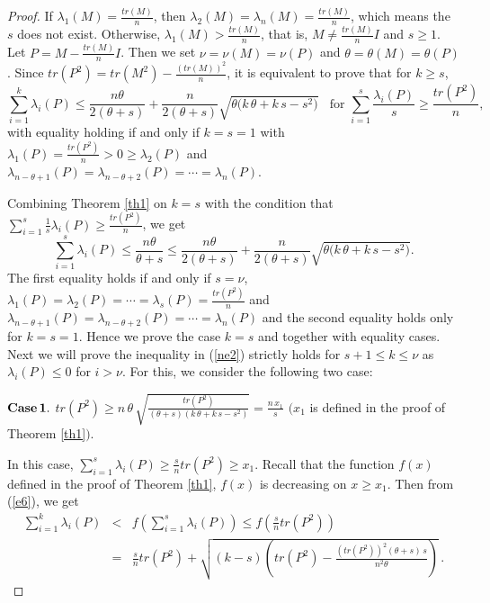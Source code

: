 \documentclass[10pt,a4paper]{amsart}
\begin{document}
\begin{proof}
If $\lambda_1(M)=\frac{tr(M)}{n}$, then $\lambda_2(M)=\lambda_n(M)=\frac{tr(M)}{n}$, which means the $s$ does not exist.
Otherwise, $\lambda_1(M)>\frac{tr(M)}{n}$, that is, $M\neq\frac{tr(M)}{n}I$ and $s\geq 1$. Let $P=M-\frac{tr(M)}{n}I$. Then we set $\nu=\nu(M)=\nu(P)$ and $\theta=\theta(M)=\theta(P)$.
 Since $tr(P^2)=tr(M^2)-\frac{(tr(M))^2}{n}$, it is equivalent to prove that for $k\geq s$,
 \begin{equation}
 \sum_{i=1}^{k}\lambda_i(P)\leq\frac{n\theta}{2(\theta+s)}+\frac{n}{2(\theta+s)}\sqrt{\theta\big(k\,\theta+k\,s-s^2\big)}~~~~\mbox{for  }\sum\limits_{i=1}^s\frac{\lambda_i(P)}{s}\geq \frac{tr(P^2)}{n},\label{ne2}
 \end{equation}
 with equality holding if and only if $k=s=1$ with $\lambda_1(P)=\frac{tr(P^2)}{n}>0\geq \lambda_2(P)$ and
 $\lambda_{n-\theta+1}(P)=\lambda_{n-\theta+2}(P)=\cdots=\lambda_n(P)$.

\vspace*{3mm}
 
 Combining Theorem \ref{th1} on $k=s$ with the condition that $\sum\limits_{i=1}^s\frac{1}{s}\lambda_i(P)\geq \frac{tr(P^2)}{n}$, we get
 $$\sum\limits_{i=1}^s\lambda_i(P)\leq\frac{n\theta}{\theta+s}\leq \frac{n\theta}{2(\theta+s)}+\frac{n}{2(\theta+s)}\sqrt{\theta\big(k\,\theta+k\,s-s^2\big)}.$$
 The first equality holds if and only if $s=\nu$, $\lambda_1(P)=\lambda_2(P)=\cdots=\lambda_s(P)=\frac{tr(P^2)}{n}$ and
 $\lambda_{n-\theta+1}(P)=\lambda_{n-\theta+2}(P)=\cdots=\lambda_n(P)$ and the second equality holds only for $k=s=1$.
 Hence we prove the case $k=s$ and together with equality cases.
 Next we will prove the inequality in (\ref{ne2}) strictly holds for $s+1\leq k\leq \nu$ as $\lambda_i(P)\leq 0$ for $i>\nu$. For this, we consider the following
two case: \vspace*{3mm}

\noindent
${\bf Case\,1.}$ $tr(P^2)\geq n\,\theta\,\sqrt{\displaystyle{\frac{tr(P^2)}{(\theta+s)(k\,\theta+k\,s-s^2)}}}=\displaystyle{\frac{n\,x_1}{s}}$ $(x_1$ is defined in the proof of Theorem \ref{th1}$)$. 

\vspace*{3mm}

In this case, $\sum\limits_{i=1}^s\lambda_i(P)\geq \frac{s}{n}tr(P^2)\geq x_1$. Recall that the function $f(x)$ defined in the proof of Theorem \ref{th1}, $f(x)$ is decreasing on $x\geq x_1$. Then from (\ref{e6}), we get
 \begin{eqnarray}
  \sum_{i=1}^{k}\lambda_i(P)&< &f\left(\sum\limits_{i=1}^s\lambda_i(P)\right)\leq f\left(\frac{s}{n}tr(P^2)\right)\nonumber\\[2mm]
  &=&\frac{s}{n}tr(P^2)+\sqrt{(k-s)\left(tr(P^2)-\frac{(tr(P^2))^2(\theta+s)\,s}{n^2\theta}\right)}\,.\label{eq1}
 \end{eqnarray}


\end{proof}
\end{document}
